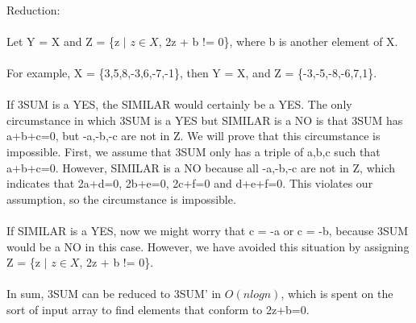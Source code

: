 \begin{problem}{2} ~\\
Reduction:\\
\\
Let Y = X and Z = \{z $|$ $z \in X$, 2z + b != 0\}, where b is another element of X.\\
\\
For example, X = \{3,5,8,-3,6,-7,-1\}, then Y = X, and Z = \{-3,-5,-8,-6,7,1\}.\\
\\
If 3SUM is a YES, the SIMILAR would certainly be a YES. The only circumstance in which 3SUM is a YES but SIMILAR is a NO is that 3SUM has a+b+c=0, but -a,-b,-c are not in Z. We will prove that this circumstance is impossible. First, we assume that 3SUM only has a triple of a,b,c such that a+b+c=0. However, SIMILAR is a NO because all -a,-b,-c are not in Z, which indicates that 2a+d=0, 2b+e=0, 2c+f=0 and d+e+f=0. This violates our assumption, so the circumstance is impossible.\\
\\
If SIMILAR is a YES, now we might worry that c = -a or c = -b, because 3SUM would be a NO in this case. However, we have avoided this situation by assigning Z = \{z $|$ $z \in X$, 2z + b != 0\}.\\
\\
In sum, 3SUM can be reduced to 3SUM' in $O(nlog{}n)$, which is spent on the sort of input array to find elements that conform to 2z+b=0.
\end{problem}